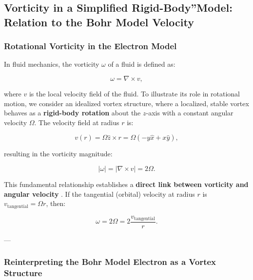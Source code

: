 

\subsection{Vorticity in a Simplified \grqq Rigid-Body\textquotedblright Model: Relation to the Bohr Model Velocity}

\subsubsection*{Rotational Vorticity in the Electron Model}

In fluid mechanics, the vorticity \( \omega \) of a fluid is defined as:

\begin{equation*}
    \omega = \nabla \times v,
\end{equation*}

where \( v \) is the local velocity field of the fluid. To illustrate its role in rotational motion, we consider an idealized vortex structure, where a localized, stable vortex behaves as a \textbf{rigid-body rotation} about the \( z \)-axis with a constant angular velocity \( \Omega \). The velocity field at radius \( r \) is:

\begin{equation*}
    v(r) = \Omega \hat{z} \times r = \Omega(-y\hat{x} + x\hat{y}),
\end{equation*}

resulting in the vorticity magnitude:

\begin{equation*}
    |\omega| = |\nabla \times v| = 2\Omega.
\end{equation*}

This fundamental relationship establishes a \textbf{direct link between vorticity and angular velocity} \cite{lamb_hydrodynamics, feynman_qed}. If the tangential (orbital) velocity at radius \( r \) is \( v_\text{tangential} = \Omega r \), then:

\begin{equation*}
    \omega = 2\Omega = 2\frac{v_\text{tangential}}{r}.
\end{equation*}

---

\subsubsection*{Reinterpreting the Bohr Model Electron as a Vortex Structure}

